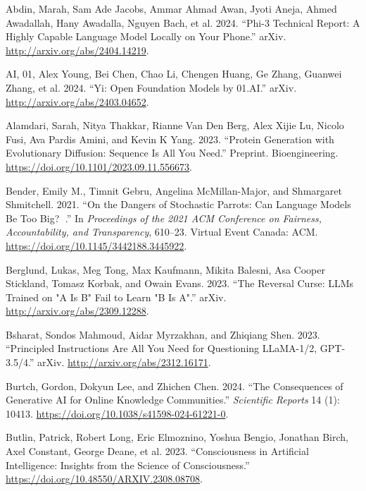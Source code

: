 \documentclass[
  Letterpaper,
]{scrbook}
\newlength{\cslhangindent}
\newenvironment{CSLReferences}[2] %
 {\begin{list}{}{%
  \setlength{\itemindent}{0pt}
  \setlength{\leftmargin}{0pt}
  \setlength{\parsep}{0pt}
  \ifodd #1
   \setlength{\leftmargin}{\cslhangindent}
   \setlength{\itemindent}{-1\cslhangindent}
  \fi
  \setlength{\itemsep}{#2\baselineskip}}}
 {\end{list}}
\begin{document}
\label{refs}
\begin{CSLReferences}{1}{0}
Abdin, Marah, Sam Ade Jacobs, Ammar Ahmad Awan, Jyoti Aneja, Ahmed
Awadallah, Hany Awadalla, Nguyen Bach, et al. 2024. {``Phi-3 {Technical}
{Report}: {A} {Highly} {Capable} {Language} {Model} {Locally} on {Your}
{Phone}.''} arXiv. \url{http://arxiv.org/abs/2404.14219}.

AI, 01, Alex Young, Bei Chen, Chao Li, Chengen Huang, Ge Zhang, Guanwei
Zhang, et al. 2024. {``Yi: {Open} {Foundation} {Models} by 01.{AI}.''}
arXiv. \url{http://arxiv.org/abs/2403.04652}.

Alamdari, Sarah, Nitya Thakkar, Rianne Van Den Berg, Alex Xijie Lu,
Nicolo Fusi, Ava Pardis Amini, and Kevin K Yang. 2023. {``Protein
Generation with Evolutionary Diffusion: Sequence Is All You Need.''}
Preprint. Bioengineering.
\url{https://doi.org/10.1101/2023.09.11.556673}.

Bender, Emily M., Timnit Gebru, Angelina McMillan-Major, and Shmargaret
Shmitchell. 2021. {``On the {Dangers} of {Stochastic} {Parrots}: {Can}
{Language} {Models} {Be} {Too} {Big}? 🦜.''} In \emph{Proceedings of the
2021 {ACM} {Conference} on {Fairness}, {Accountability}, and
{Transparency}}, 610--23. Virtual Event Canada: ACM.
\url{https://doi.org/10.1145/3442188.3445922}.

Berglund, Lukas, Meg Tong, Max Kaufmann, Mikita Balesni, Asa Cooper
Stickland, Tomasz Korbak, and Owain Evans. 2023. {``The {Reversal}
{Curse}: {LLMs} Trained on "{A} Is {B}" Fail to Learn "{B} Is {A}".''}
arXiv. \url{http://arxiv.org/abs/2309.12288}.

Bsharat, Sondos Mahmoud, Aidar Myrzakhan, and Zhiqiang Shen. 2023.
{``Principled {Instructions} {Are} {All} {You} {Need} for {Questioning}
{LLaMA}-1/2, {GPT}-3.5/4.''} arXiv.
\url{http://arxiv.org/abs/2312.16171}.

Burtch, Gordon, Dokyun Lee, and Zhichen Chen. 2024. {``The Consequences
of Generative {AI} for Online Knowledge Communities.''} \emph{Scientific
Reports} 14 (1): 10413.
\url{https://doi.org/10.1038/s41598-024-61221-0}.

Butlin, Patrick, Robert Long, Eric Elmoznino, Yoshua Bengio, Jonathan
Birch, Axel Constant, George Deane, et al. 2023. {``Consciousness in
{Artificial} {Intelligence}: {Insights} from the {Science} of
{Consciousness}.''} \url{https://doi.org/10.48550/ARXIV.2308.08708}.


\end{CSLReferences}
\end{document}
